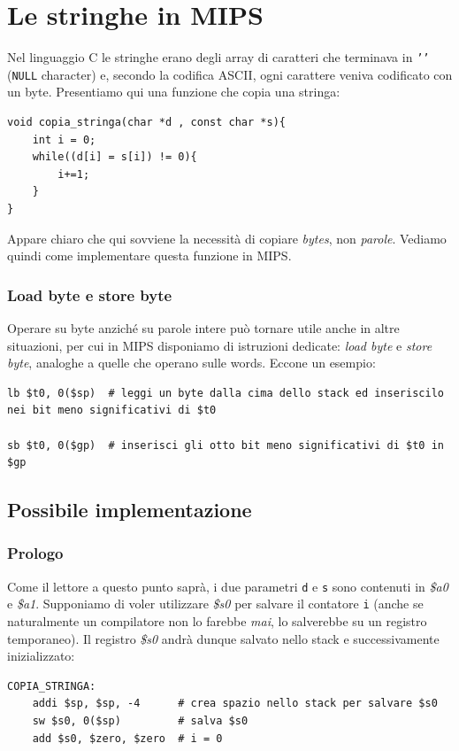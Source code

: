\documentclass[class=book, crop=false]{standalone}
\begin{document}
\section{Le stringhe in MIPS}
Nel linguaggio C le stringhe erano degli array di caratteri che terminava in \texttt{'\0'} (\texttt{NULL} character)
e, secondo la codifica ASCII, ogni carattere veniva codificato con un byte. Presentiamo qui una funzione che copia una stringa:
\begin{verbatim}
void copia_stringa(char *d , const char *s){
	int i = 0;
	while((d[i] = s[i]) != 0){
		i+=1;
	}
}
\end{verbatim}
Appare chiaro che qui sovviene la necessità di copiare \emph{bytes}, non \emph{parole}. Vediamo quindi come implementare questa funzione in MIPS.

\subsubsection{Load byte e store byte}
Operare su byte anziché su parole intere può tornare utile anche in altre situazioni, per cui in MIPS disponiamo di istruzioni dedicate: \emph{load byte} e \emph{store byte}, analoghe a quelle che operano sulle words. Eccone un esempio:
\begin{verbatim}
lb $t0, 0($sp)  # leggi un byte dalla cima dello stack ed inseriscilo nei bit meno significativi di $t0

sb $t0, 0($gp)  # inserisci gli otto bit meno significativi di $t0 in $gp
\end{verbatim}

\subsection{Possibile implementazione}

\subsubsection{Prologo}
Come il lettore a questo punto saprà, i due parametri \texttt{d} e \texttt{s} sono contenuti in \emph{\$a0} e \emph{\$a1}. Supponiamo di voler utilizzare \emph{\$s0} per salvare il contatore \texttt{i} (anche se naturalmente un compilatore non lo farebbe \emph{mai}, lo salverebbe su un registro temporaneo). Il registro \emph{\$s0} andrà dunque salvato nello stack e successivamente inizializzato:
\begin{verbatim}
COPIA_STRINGA:
	addi $sp, $sp, -4      # crea spazio nello stack per salvare $s0
	sw $s0, 0($sp)         # salva $s0
	add $s0, $zero, $zero  # i = 0
\end{verbatim}
\end{document}

